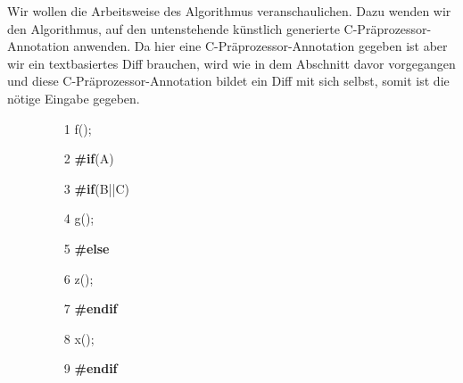 Wir wollen die Arbeitsweise des Algorithmus veranschaulichen. Dazu wenden wir den Algorithmus, auf den untenstehende künstlich generierte C-Präprozessor-Annotation anwenden. Da hier eine C-Präprozessor-Annotation gegeben ist aber wir ein textbasiertes Diff brauchen, wird wie in dem Abschnitt davor vorgegangen und diese C-Präprozessor-Annotation bildet ein Diff mit sich selbst, somit ist die nötige Eingabe gegeben.
\begin{figure}[h]
	\begin{itemize}
		\item[1 ] f();
		\item[2 ] \textbf{\#if}(A)
		\item[3 ] \hspace*{0.5cm} \textbf{\#if}(B||C)
		\item[4 ] \hspace*{1cm}g();
		\item[5 ] \hspace*{0.5cm}\textbf{\#else}
		\item[6 ] \hspace*{1cm}z();
		\item[7 ] \hspace*{0.5cm}\textbf{\#endif}
		\item[8 ] \hspace*{0.5cm}x();
		\item[9 ] \textbf{\#endif}
	\end{itemize}
\end{figure}
